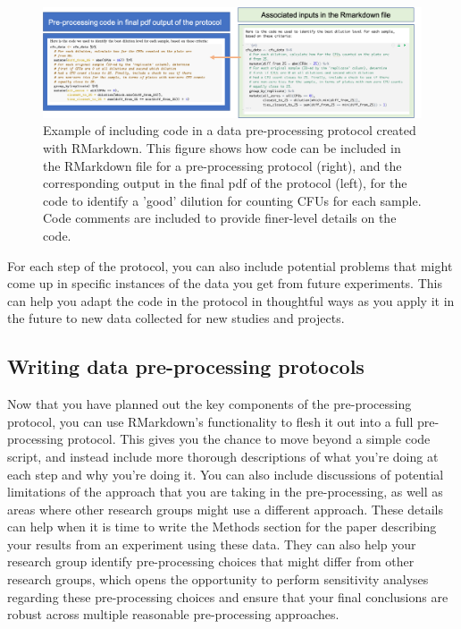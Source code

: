 \documentclass[]{tufte-book}
\begin{document}
\begin{figure}
\includegraphics[width=\textwidth]{figures/protocol_code} \caption[Example of including code in a data pre-processing protocol created with RMarkdown]{Example of including code in a data pre-processing protocol created with RMarkdown. This figure shows how code can be included in the RMarkdown file for a pre-processing protocol (right), and the corresponding output in the final pdf of the protocol (left), for the code to identify a 'good' dilution for counting CFUs for each sample. Code comments are included to provide finer-level details on the code.}\label{fig:protocolcode}
\end{figure}

For each step of the protocol, you can also include potential problems
that might come up in specific instances of the data you get from
future experiments. This can help you adapt the code in the protocol in
thoughtful ways as you apply it in the future to new data collected
for new studies and projects.

\subsection{Writing data pre-processing protocols}\label{writing-data-pre-processing-protocols}

Now that you have planned out the key components of the pre-processing protocol,
you can use RMarkdown's functionality to flesh it out into a full pre-processing
protocol. This gives you the chance to move beyond a simple code script, and
instead include more thorough descriptions of what you're doing at each step and
why you're doing it. You can also include discussions of potential limitations
of the approach that you are taking in the pre-processing, as well as areas
where other research groups might use a different approach. These details can
help when it is time to write the Methods section for the paper describing your
results from an experiment using these data. They can also help your research
group identify pre-processing choices that might differ from other research
groups, which opens the opportunity to perform sensitivity analyses regarding
these pre-processing choices and ensure that your final conclusions are robust
across multiple reasonable pre-processing approaches.
\end{document}
